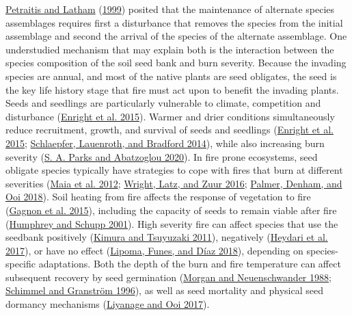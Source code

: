 \documentclass[
  12pt,
]{article}
\begin{document}
\protect\hyperlink{ref-Petraitis1999}{Petraitis and Latham}
(\protect\hyperlink{ref-Petraitis1999}{1999}) posited that the
maintenance of alternate species assemblages requires first a
disturbance that removes the species from the initial assemblage and
second the arrival of the species of the alternate assemblage. One
understudied mechanism that may explain both is the interaction between
the species composition of the soil seed bank and burn severity. Because
the invading species are annual, and most of the native plants are seed
obligates, the seed is the key life history stage that fire must act
upon to benefit the invading plants. Seeds and seedlings are
particularly vulnerable to climate, competition and disturbance
(\protect\hyperlink{ref-Enright2015}{Enright et al. 2015}). Warmer and
drier conditions simultaneously reduce recruitment, growth, and survival
of seeds and seedlings (\protect\hyperlink{ref-Enright2015}{Enright et
al. 2015}; \protect\hyperlink{ref-Schlaepfer2014}{Schlaepfer, Lauenroth,
and Bradford 2014}), while also increasing burn severity
(\protect\hyperlink{ref-Parks2020}{S. A. Parks and Abatzoglou 2020}). In
fire prone ecosystems, seed obligate species typically have strategies
to cope with fires that burn at different severities
(\protect\hyperlink{ref-Maia2012}{Maia et al. 2012};
\protect\hyperlink{ref-Wright2016}{Wright, Latz, and Zuur 2016};
\protect\hyperlink{ref-Palmer2018}{Palmer, Denham, and Ooi 2018}). Soil
heating from fire affects the response of vegetation to fire
(\protect\hyperlink{ref-Gagnon2015}{Gagnon et al. 2015}), including the
capacity of seeds to remain viable after fire
(\protect\hyperlink{ref-Humphrey2001}{Humphrey and Schupp 2001}). High
severity fire can affect species that use the seedbank positively
(\protect\hyperlink{ref-Kimura2011}{Kimura and Tsuyuzaki 2011}),
negatively (\protect\hyperlink{ref-Heydari2017}{Heydari et al. 2017}),
or have no effect (\protect\hyperlink{ref-Lipoma2018}{Lipoma, Funes, and
Díaz 2018}), depending on species-specific adaptations. Both the depth
of the burn and fire temperature can affect subsequent recovery by seed
germination (\protect\hyperlink{ref-Morgan1988}{Morgan and
Neuenschwander 1988}; \protect\hyperlink{ref-Schimmel1996}{Schimmel and
Granström 1996}), as well as seed mortality and physical seed dormancy
mechanisms (\protect\hyperlink{ref-Liyanage2017}{Liyanage and Ooi
2017}).
\end{document}
